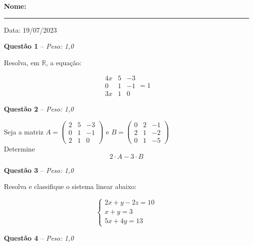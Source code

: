 \documentclass[a4paper,11pt]{article}
\begin{document}
\textbf{Nome:} \rule{12cm}{0.2mm} Data: 19/07/2023


\begin{mdframed}[backgroundcolor=gray!20]
\textbf{Questão 1} -- \textit{Peso: 1,0}
\end{mdframed}

Resolva, em $\mathbb{R}$, a equação:


\[
\begin{array}{|ccc|}
4x & 5 & - 3  \\
0 &  1 & - 1  \\
3x &  1 &  0 
\end{array}=1
\]


\begin{mdframed}[backgroundcolor=gray!20]
\textbf{Questão 2} -- \textit{Peso: 1,0}
\end{mdframed}


Seja a matriz $A=\begin{pmatrix}
2 & 5 & - 3  \\
0 &  1 & - 1  \\
2 &  1 &  0 
\end{pmatrix}$ 
e 
$B=\begin{pmatrix}
0 & 2 & - 1  \\
2 &  1 & - 2  \\
0 &  1 &  -5 
\end{pmatrix}
$\\
Determine\\
$$2\cdot A-3\cdot B$$

\begin{mdframed}[backgroundcolor=gray!20]
\textbf{Questão 3} -- \textit{Peso: 1,0}
\end{mdframed}

Resolva e classifique o sistema linear abaixo:

\begin{equation*}
\left\{
\begin{matrix}
2x +  y  -  2z  =  10\\
x  +  y   =  3\\
5x  +  4y  =  13
\end{matrix}
\right.
\end{equation*} 



\begin{mdframed}[backgroundcolor=gray!20]
\textbf{Questão 4} -- \textit{Peso: 1,0}
\end{mdframed}
\end{document}
